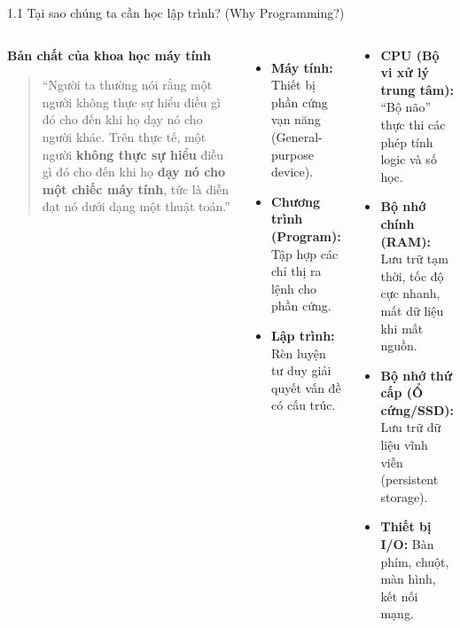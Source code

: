 \documentclass[aspectratio=169, 10pt]{beamer}
\begin{document}
\begin{frame}{1.1 Tại sao chúng ta cần học lập trình? (Why Programming?)}
  \begin{columns}
    \begin{block}{\textbf{Bản chất của khoa học máy tính}}
      \begin{quote}
        ``Người ta thường nói rằng một người không thực sự hiểu điều gì đó cho đến khi họ dạy nó cho người khác. Trên thực tế, một người \textbf{không thực sự hiểu} điều gì đó cho đến khi họ \textbf{dạy nó cho một chiếc máy tính}, tức là diễn đạt nó dưới dạng một thuật toán.''
      \end{quote}
    \end{block}
    \vspace{2mm}
    \begin{itemize}
      \item \textbf{Máy tính:} Thiết bị phần cứng vạn năng (General-purpose device).
      \item \textbf{Chương trình (Program):} Tập hợp các chỉ thị ra lệnh cho phần cứng.
      \item \textbf{Lập trình:} Rèn luyện tư duy giải quyết vấn đề có cấu trúc.
    \end{itemize}

    \begin{tcolorbox}[colback=white,colframe=UniBlue,title=\textbf{Thành phần cốt lõi của máy tính}]
      \small
      \begin{itemize}
        \item \textbf{CPU (Bộ vi xử lý trung tâm):} ``Bộ não'' thực thi các phép tính logic và số học.
        \item \textbf{Bộ nhớ chính (RAM):} Lưu trữ tạm thời, tốc độ cực nhanh, mất dữ liệu khi mất nguồn.
        \item \textbf{Bộ nhớ thứ cấp (Ổ cứng/SSD):} Lưu trữ dữ liệu vĩnh viễn (persistent storage).
        \item \textbf{Thiết bị I/O:} Bàn phím, chuột, màn hình, kết nối mạng.
      \end{itemize}
    \end{tcolorbox}
  \end{columns}
\end{frame}
\end{document}
